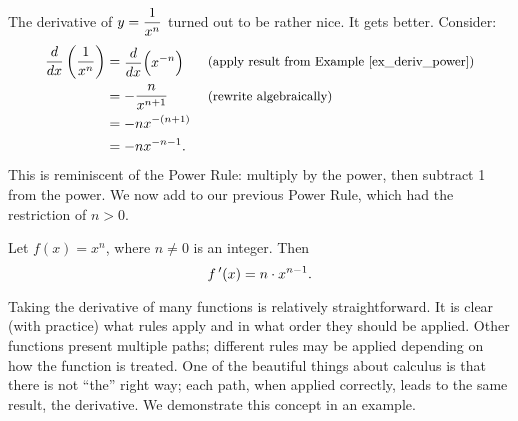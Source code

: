 The derivative of $\displaystyle y=\frac{1}{x^n}$ turned out to be rather nice. It gets better. Consider:
\begin{align*} \frac{d}{dx}\left(\frac{1}{x^n}\right) &= \parbox{60pt}{$\ds\frac{d}{dx}\Big(x^{-n}\Big)$} \text{\small (apply result from Example \ref{ex_deriv_power})}\\
									&= \parbox{60pt}{$\ds-\frac{n}{x^{n+1}}$}\text{\small (rewrite algebraically)} \\
									&= -nx^{-(n+1)} \\
									&= -nx^{-n-1}.
	\end{align*}
This is reminiscent of the Power Rule: multiply by the power, then subtract 1 from the power. We now add to our previous Power Rule, which had the restriction of $n>0$.

{Let $f(x) = x^n$, where $n\neq 0$ is an integer. Then $$f\,'(x) = n\cdot x^{n-1}.$$
}

Taking the derivative of many functions is relatively straightforward. It is clear (with practice) what rules apply and in what order they should be applied. Other functions present multiple paths; different rules may be applied depending on how the function is treated. One of the beautiful things about calculus is that there is not ``the'' right way; each path, when applied correctly, leads to the same result, the derivative. We demonstrate this concept in an example.\\

